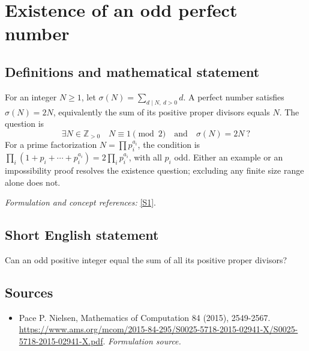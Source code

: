 \documentclass[11pt]{article}
\begin{document}
\section*{\texorpdfstring{Existence of an odd perfect number}{Existence of an odd perfect number}}\label{245}
\subsection{Definitions and mathematical statement}
For an integer $N\ge1$, let $\sigma(N)=\sum_{d\mid N,\ d>0}d$. A perfect number satisfies $\sigma(N)=2N$, equivalently the sum of its positive proper divisors equals $N$. The question is
\[
 \exists N\in{\mathbb{Z}}_{>0}\quad N\equiv1\pmod2\quad\text{and}\quad\sigma(N)=2N\ ?
\]
For a prime factorization $N=\prod p_i^{a_i}$, the condition is
$\prod_i(1+p_i+\cdots+p_i^{a_i})=2\prod_i p_i^{a_i}$, with all $p_i$ odd. Either an example or an impossibility proof resolves the existence question; excluding any finite size range alone does not.
\par\smallskip\textit{Formulation and concept references:} \href{https://www.ams.org/mcom/2015-84-295/S0025-5718-2015-02941-X/S0025-5718-2015-02941-X.pdf}{[S1]}.

\subsection{Short English statement}
Can an odd positive integer equal the sum of all its positive proper divisors?
\subsection{Sources}
\begin{itemize}
\item[S1]Pace P. Nielsen, Mathematics of Computation 84 (2015), 2549-2567.
\url{https://www.ams.org/mcom/2015-84-295/S0025-5718-2015-02941-X/S0025-5718-2015-02941-X.pdf}.
\textit{Formulation source.}
\end{itemize}
\end{document}
